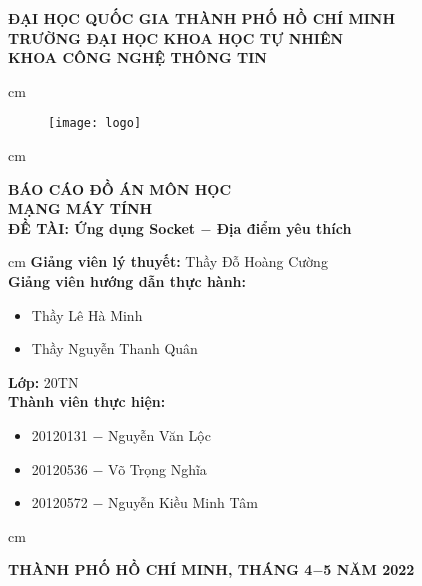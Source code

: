\begin{titlepage}
\begin{mybox}
\begin{center}
\fontsize{12}{12}\selectfont
\textbf{ĐẠI HỌC QUỐC GIA THÀNH PHỐ HỒ CHÍ MINH}\\
\textbf{TRƯỜNG ĐẠI HỌC KHOA HỌC TỰ NHIÊN}\\
\textbf{KHOA CÔNG NGHỆ THÔNG TIN}
\end{center}
 cm
\begin{figure}[H]
\begin{center}
\texttt{[image: logo]}
\end{center}
\end{figure}
 cm
\begin{center}
\fontsize{18}{14}\selectfont
\textbf{BÁO CÁO ĐỒ ÁN MÔN HỌC}\\
\fontsize{26}{16}\selectfont
\textbf{MẠNG MÁY TÍNH}\\
\fontsize{18}{12}\selectfont
\textbf{ĐỀ TÀI: Ứng dụng Socket $-$ Địa điểm yêu thích}
\end{center}
 cm
\fontsize{14}{12}\selectfont
\textbf{Giảng viên lý thuyết:} Thầy Đỗ Hoàng Cường\\
\textbf{Giảng viên hướng dẫn thực hành:}
\begin{itemize}
\item Thầy Lê Hà Minh
\item Thầy Nguyễn Thanh Quân
\end{itemize}
\textbf{Lớp:} 20TN\\
\textbf{Thành viên thực hiện:}
\begin{itemize}
\item 20120131 $-$ Nguyễn Văn Lộc
\item 20120536 $-$ Võ Trọng Nghĩa
\item 20120572 $-$ Nguyễn Kiều Minh Tâm
\end{itemize}
 cm
\begin{center}
\textbf{THÀNH PHỐ HỒ CHÍ MINH, THÁNG 4$-$5 NĂM 2022}
\end{center}
\end{mybox}
\end{titlepage}